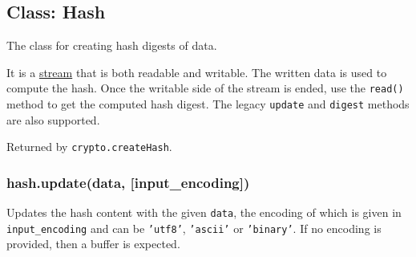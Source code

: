 \begin{Shaded}
\begin{Highlighting}[]
 \NormalTok{[}\NormalTok{];}
 \NormalTok{);}
 \NormalTok{);}

 \NormalTok{(}\NormalTok{);}

 
\NormalTok{(}\NormalTok{, }
\NormalTok{\});}

\NormalTok{(}\NormalTok{, }\NormalTok{() \{}
   \NormalTok{(}\NormalTok{);}
   
\NormalTok{\});}
\end{Highlighting}
\end{Shaded}

\subsection{Class: Hash}

The class for creating hash digests of data.

It is a \href{stream.html}{stream} that is both readable and writable.
The written data is used to compute the hash. Once the writable side of
the stream is ended, use the \texttt{read()} method to get the computed
hash digest. The legacy \texttt{update} and \texttt{digest} methods are
also supported.

Returned by \texttt{crypto.createHash}.

\subsubsection{hash.update(data, {[}input\_encoding{]})}

Updates the hash content with the given \texttt{data}, the encoding of
which is given in \texttt{input\_encoding} and can be \texttt{'utf8'},
\texttt{'ascii'} or \texttt{'binary'}. If no encoding is provided, then
a buffer is expected.

